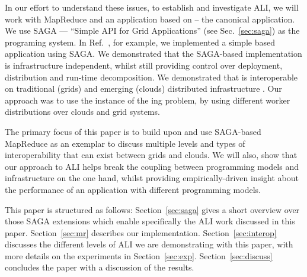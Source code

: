 \documentclass[3p,twocolumn]{elsarticle}
\begin{document}

In our effort to understand these issues, to establish and investigate
ALI, we will work with MapReduce and an application based on \mr --
the canonical \wc application.  We use SAGA --- “Simple API for Grid
Applications'' (see Sec.~\ref{sec:saga}) as the programing system.  In
Ref.~\cite{saga_ccgrid09}, for example, we implemented a simple \mr
based \wc application using SAGA.  We demonstrated that the SAGA-based
implementation is infrastructure independent, whilst still providing
control over deployment, distribution and run-time decomposition.
We demonstrated that \sagamapreduce is interoperable on traditional
(grids) and emerging (clouds) distributed infrastructure
.  Our approach was to %
use the  %
instance of the {\wc}ing problem, by using different worker
distributions over clouds and grid systems.

The primary focus of this paper is to build upon and use SAGA-based
MapReduce as an exemplar to discuss multiple levels and types of
interoperability that can exist between grids and clouds. We will
also, show that our approach to ALI helps break the coupling between
programming models and infrastructure on the one hand, whilst providing
empirically-driven insight about the performance of an application
with different programming models.



This paper is structured as follows: Section~\ref{sec:saga} gives a
short overview over those SAGA extensions which enable specifically
the ALI work discussed in this paper.  Section~\ref{sec:mr} describes
our \smr implementation.  Section~\ref{sec:interop} discusses the
different levels of ALI we are demonstrating with this paper, with
more details on the experiments in Section~\ref{sec:exp}.
Section~\ref{sec:discuss} concludes the paper with a discussion of the
results.
\end{document}
